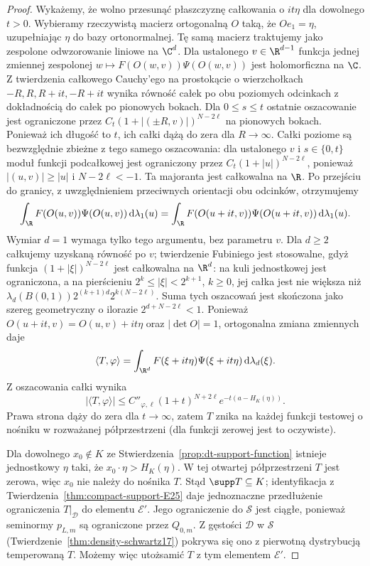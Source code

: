 \begin{proof}
Wykażemy, że wolno przesunąć płaszczyznę całkowania
o $it\eta$ dla dowolnego $t>0$.
Wybieramy rzeczywistą macierz ortogonalną $O$ taką,
że $Oe_1=\eta$, uzupełniając $\eta$ do bazy
ortonormalnej. Tę samą macierz traktujemy jako
zespolone odwzorowanie liniowe na $\C^d$.
Dla ustalonego $v\in\R^{d-1}$
funkcja jednej zmiennej zespolonej
$w\mapsto F(O(w,v))\Psi(O(w,v))$
jest holomorficzna na $\C$.
Z twierdzenia całkowego Cauchy'ego na prostokącie
o wierzchołkach $-R,R,R+it,-R+it$ wynika równość
całek po obu poziomych odcinkach z dokładnością
do całek po pionowych bokach. Dla $0\le s\le t$
ostatnie oszacowanie jest ograniczone przez
$C_t(1+|(\pm R,v)|)^{N-2\ell}$ na pionowych bokach.
Ponieważ ich długość to $t$, ich całki dążą do zera
dla $R\to\infty$.
Całki poziome są bezwzględnie zbieżne z tego samego
oszacowania: dla ustalonego $v$ i $s\in\{0,t\}$
moduł funkcji podcałkowej jest ograniczony przez
$C_t(1+|u|)^{N-2\ell}$, ponieważ
$|(u,v)|\ge|u|$ i $N-2\ell<-1$.
Ta majoranta jest całkowalna na $\R$.
Po przejściu do granicy, z uwzględnieniem
przeciwnych orientacji obu odcinków, otrzymujemy
\[
 \int_{\R}F(O(u,v))\Psi(O(u,v))\,\mathrm d\lambda_1(u)
 =\int_{\R}F(O(u+it,v))\Psi(O(u+it,v))
 \,\mathrm d\lambda_1(u).
\]
Wymiar $d=1$ wymaga tylko tego argumentu,
bez parametru $v$. Dla $d\ge2$ całkujemy uzyskaną
równość po $v$; twierdzenie Fubiniego jest stosowalne,
gdyż funkcja $(1+|\xi|)^{N-2\ell}$ jest całkowalna
na $\R^d$: na kuli jednostkowej jest ograniczona,
a na pierścieniu $2^k\le|\xi|<2^{k+1}$, $k\ge0$,
jej całka jest nie większa niż
$\lambda_d(B(0,1))2^{(k+1)d}2^{k(N-2\ell)}$.
Suma tych oszacowań jest skończona jako szereg
geometryczny o ilorazie $2^{d+N-2\ell}<1$.
Ponieważ $O(u+it,v)=O(u,v)+it\eta$ oraz
$|\det O|=1$, ortogonalna zmiana zmiennych daje
\[
 \langle T,\varphi\rangle
 =\int_{\R^d}F(\xi+it\eta)\Psi(\xi+it\eta)
 \,\mathrm d\lambda_d(\xi).
\]
Z oszacowania całki wynika
\[
 |\langle T,\varphi\rangle|
 \le C''_{\varphi,\ell}(1+t)^{N+2\ell}
 e^{-t(a-H_K(\eta))}.
\]
Prawa strona dąży do zera dla $t\to\infty$, zatem
$T$ znika na każdej funkcji testowej o nośniku
w rozważanej półprzestrzeni (dla funkcji zerowej
jest to oczywiste).

Dla dowolnego $x_0\notin K$ ze
Stwierdzenia~\ref{prop:dt-support-function} istnieje
jednostkowy $\eta$ taki, że $x_0\cdot\eta>H_K(\eta)$.
W tej otwartej półprzestrzeni $T$ jest zerowa,
więc $x_0$ nie należy do nośnika $T$.
Stąd $\supp T\subseteq K$; identyfikacja z
Twierdzenia~\ref{thm:compact-support-E25} daje
jednoznaczne przedłużenie ograniczenia $T|_{\mathcal D}$
do elementu $\mathcal E'$. Jego ograniczenie do
$\mathcal S$ jest ciągłe, ponieważ seminormy
$p_{L,m}$ są ograniczone przez $Q_{0,m}$.
Z gęstości $\mathcal D$ w $\mathcal S$
(Twierdzenie~\ref{thm:density-schwartz17}) pokrywa się
ono z pierwotną dystrybucją temperowaną $T$.
Możemy więc utożsamić $T$ z tym elementem $\mathcal E'$.


\end{proof}
